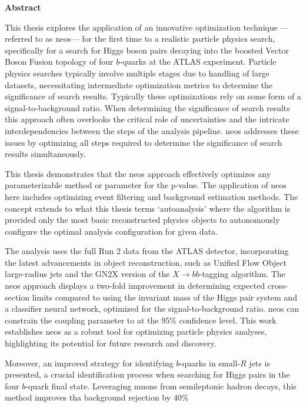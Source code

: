 \begin{center}
    \textbf{Abstract}
\end{center}
\noindent

This thesis explores the application of an innovative optimization technique —referred to as \acf{neos}— for the first time to a realistic particle physics search, specifically for  a search for Higgs boson pairs decaying into the boosted Vector Boson Fusion topology of four $b$-quarks at the ATLAS experiment. Particle physics searches typically involve multiple stages due to handling of large datasets, necessitating intermediate optimization metrics to determine the significance of search results. Typically these optimizations rely on some form of a signal-to-background ratio. When determining the significance of search results this approach often overlooks the critical role of uncertainties and the intricate interdependencies between the steps of the analysis pipeline. \ac{neos} addresses these issues by optimizing all steps required to determine the significance of search results simultaneously.

This thesis demonstrates that the \ac{neos} approach effectively optimizes any parameterizable method or parameter for the p-value. The application of \ac{neos} here includes optimizing event filtering and background estimation methods. The concept extends to what this thesis terms `autoanalysis' where the algorithm is provided only the most basic reconstructed physics objects to autonomously configure the optimal analysis configuration for given data.

The analysis uses the full Run 2 data from the ATLAS detector, incorporating the latest advancements in object reconstruction, such as Unified Flow Object large-radius jets and the GN2X version of the $X\rightarrow bb$-tagging algorithm. The \ac{neos} approach displays a two-fold improvement in determining expected cross-section limits compared to using the invariant mass of the Higgs pair system and a classifier neural network, optimized for the signal-to-background ratio. \ac{neos} can constrain the \ktwov coupling parameter to  at the 95\% confidence level. This work establishes \ac{neos} as a robust tool for optimizing particle physics analyses, highlighting its potential for future research and discovery.

Moreover, an improved strategy for identifying $b$-quarks in small-$R$ jets is presented, a crucial identification process when searching for Higgs pairs in the four $b$-quark final state. Leveraging muons from semileptonic hadron decays, this method improves tha background rejection by 40\%

